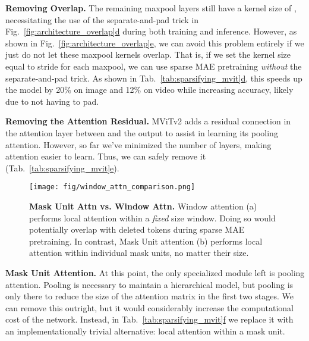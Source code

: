 \documentclass[nohyperref]{article}
\renewcommand{\paragraph}[1]{\vspace{1.25mm}\noindent\textbf{#1}}
\theoremstyle{plain}
\theoremstyle{definition}
\theoremstyle{remark}
\begin{document}
\paragraph{Removing Overlap.}
The remaining maxpool layers still have a kernel size of , necessitating the use of the separate-and-pad trick in Fig.~\ref{fig:architecture_overlap}\hyperref[fig:architecture_overlap]{d} during both training and inference. However, as shown in Fig.~\ref{fig:architecture_overlap}\hyperref[fig:architecture_overlap]{e}, we can avoid this problem entirely if we just do not let these maxpool kernels overlap. That is, if we set the kernel size equal to stride for each maxpool, we can use sparse MAE pretraining \textit{without} the separate-and-pad trick. As shown in Tab.~\ref{tab:sparsifying_mvit}\hyperref[tab:sparsifying_mvit]{d}, this speeds up the model by 20\% on image and 12\% on video while increasing accuracy, likely due to not having to pad.

\paragraph{Removing the Attention Residual.}
MViTv2 adds a residual connection in the attention layer between  and the output to assist in learning its pooling attention. However, so far we've minimized the number of layers, making attention easier to learn. Thus, we can safely remove it (Tab.~\ref{tab:sparsifying_mvit}\hyperref[tab:sparsifying_mvit]{e}). 



\begin{figure}[t]
\centering
\texttt{[image: fig/window\_attn\_comparison.png]}
\vspace{-.5em}
\caption{\textbf{Mask Unit Attn vs. Window Attn.} Window attention (a) performs local attention within a \textit{fixed} size window. Doing so would potentially overlap with deleted tokens during sparse MAE pretraining. In contrast, Mask Unit attention (b) performs local attention within individual mask units, no matter their size.
}
\label{fig:window_vs_mu_attn}
    \vspace{-10pt}
\end{figure}


\paragraph{Mask Unit Attention.}
At this point, the only specialized module left is pooling attention. Pooling  is necessary to maintain a hierarchical model, but  pooling is only there to reduce the size of the attention matrix in the first two stages. We can remove this outright, but it would considerably increase the computational cost of the network. Instead, in Tab.~\ref{tab:sparsifying_mvit}\hyperref[tab:sparsifying_mvit]{f} we replace it with an implementationally trivial alternative: local attention within a mask unit.
\end{document}
